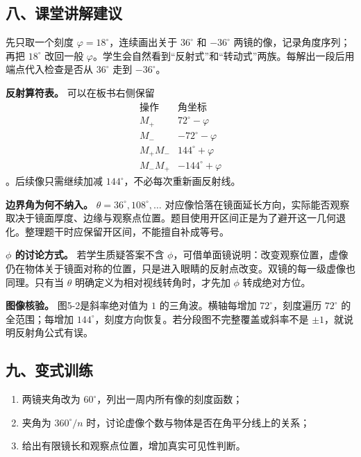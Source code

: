\documentclass[12pt,a4paper,UTF8]{ctexart}
\newcommand{\tightlist}{\setlength{\itemsep}{0pt}\setlength{\parskip}{0pt}}
\begin{document}
\subsection{八、课堂讲解建议}\label{ux516bux8bfeux5802ux8bb2ux89e3ux5efaux8bae-4}

先只取一个刻度 \(\varphi=18^\circ\)，连续画出关于 \(36^\circ\) 和
\(-36^\circ\) 两镜的像，记录角度序列；再把 \(18^\circ\) 改回一般
\(\varphi\)。学生会自然看到``反射式''和``转动式''两族。每解出一段后用端点代入检查是否从
\(36^\circ\) 走到 \(-36^\circ\)。

\textbf{反射算符表。} 可以在板书右侧保留 \[
\begin{array}{c|c}
\text{操作}&\text{角坐标}\\ \hline
M_+&72^\circ-\varphi\\
M_-&-72^\circ-\varphi\\
M_+M_-&144^\circ+\varphi\\
M_-M_+&-144^\circ+\varphi
\end{array}
\] 。后续像只需继续加减 \(144^\circ\)，不必每次重新画反射线。

\textbf{边界角为何不纳入。} \(\theta=36^\circ,108^\circ,\ldots\)
对应像恰落在镜面延长方向，实际能否观察取决于镜面厚度、边缘与观察点位置。题目使用开区间正是为了避开这一几何退化。整理题干时应保留开区间，不能擅自补成等号。

\textbf{\(\phi\) 的讨论方式。} 若学生质疑答案不含
\(\phi\)，可借单面镜说明：改变观察位置，虚像仍在物体关于镜面对称的位置，只是进入眼睛的反射点改变。双镜的每一级虚像也同理。只有当
\(\theta\) 明确定义为相对视线转角时，才先加 \(\phi\) 转成绝对方位。

\textbf{图像核验。} 图5-2是斜率绝对值为 \(1\) 的三角波。横轴每增加
\(72^\circ\)，刻度遍历 \(72^\circ\) 的全范围；每增加
\(144^\circ\)，刻度方向恢复。若分段图不完整覆盖或斜率不是
\(\pm1\)，就说明反射角公式有误。

\subsection{九、变式训练}\label{ux4e5dux53d8ux5f0fux8badux7ec3-4}

\begin{enumerate}
\def\labelenumi{\arabic{enumi}.}
\tightlist
\item
  两镜夹角改为 \(60^\circ\)，列出一周内所有像的刻度函数；
\item
  夹角为 \(360^\circ/n\) 时，讨论虚像个数与物体是否在角平分线上的关系；
\item
  给出有限镜长和观察点位置，增加真实可见性判断。
\end{enumerate}
\end{document}
